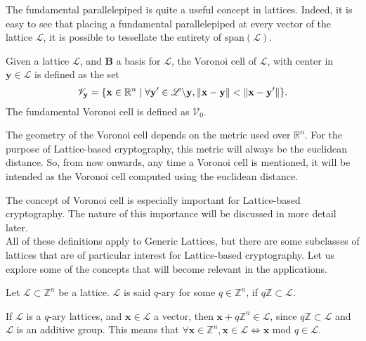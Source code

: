 \begin{remark}
The fundamental parallelepiped is quite a useful concept in lattices. Indeed, it is easy to see that placing a fundamental parallelepiped at every vector of the lattice $\mathscr{L}$, it is possible to tessellate the entirety of $\mathrm{span}(\mathscr{L})$.
\end{remark}

\begin{definition}
Given a lattice $\mathscr{L}$, and $\mathbf{B}$ a basis for $\mathscr{L}$, the Voronoi cell of $\mathscr{L}$, with center in $\mathbf{y}\in\mathscr{L}$ is defined as the set
\begin{equation*}
\mathscr{V}_\mathbf{y} = \{\mathbf{x}\in\mathbb{R}^n\mid\forall \mathbf{y}' \in \mathscr{L}\backslash\mathbf{y}, \left\lVert \mathbf{x}-\mathbf{y} \right\rVert < \left\lVert \mathbf{x}-\mathbf{y}' \right\rVert \}.
\end{equation*}
The fundamental Voronoi cell is defined as $\mathscr{V}_0$. 
\end{definition}

\begin{remark}
The geometry of the Voronoi cell depends on the metric used over $\mathbb{R}^n$. For the purpose of Lattice-based cryptography, this metric will always be the euclidean distance. So, from now onwards, any time a Voronoi cell is mentioned, it will be intended as the Voronoi cell computed using the euclidean distance.
\end{remark}

The concept of Voronoi cell is especially important for Lattice-based cryptography. The nature of this importance will be discussed in more detail later.\\
All of these definitions apply to Generic Lattices, but there are some subclasses of lattices that are of particular interest for Lattice-based cryptography. Let us explore some of the concepts that will become relevant in the applications.

\begin{definition}
Let $\mathscr{L}\subset\mathbb{Z}^n$ be a lattice. $\mathscr{L}$ is said $q$-ary for some $q\in\mathbb{Z}^n$, if $q\mathbb{Z}\subset\mathscr{L}$.
\end{definition} 

\begin{remark}
If $\mathscr{L}$ is a $q$-ary lattices, and $\mathbf{x}\in\mathscr{L}$ a vector, then $\mathbf{x}+q\mathbb{Z}^n\in\mathscr{L}$, since $q\mathbb{Z}\subset\mathscr{L}$ and $\mathscr{L}$ is an additive group. This means that $\forall\mathbf{x}\in\mathbb{Z}^n, \mathbf{x}\in\mathscr{L}\Leftrightarrow\mathbf{x}$ $\mathrm{mod}$ $q\in\mathscr{L}$.
\end{remark}


